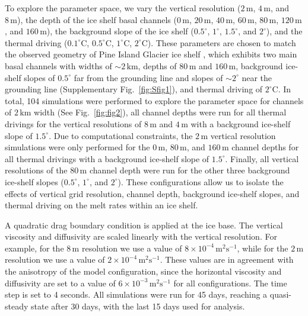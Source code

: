 \documentclass[draft]{agujournal2019}
\begin{document}
To explore the parameter space, we vary the vertical resolution ($2\,\mathrm{m}$, $4\,\mathrm{m}$, and $8\,\mathrm{m}$), the depth of the ice shelf basal channels ($0\,\mathrm{m}$, $20\,\mathrm{m}$, $40\,\mathrm{m}$, $60\,\mathrm{m}$, $80\,\mathrm{m}$, $120\,\mathrm{m}$, and $160\,\mathrm{m}$), the background slope of the ice shelf ($0.5^\circ$, $1^\circ$, $1.5^\circ$, and $2^\circ$), and the thermal driving ($0.1^\circ \mathrm{C}$, $0.5^\circ \mathrm{C}$, $1^\circ \mathrm{C}$, $2^\circ \mathrm{C}$). These parameters are chosen to match the observed geometry of Pine Island Glacier ice shelf \citep{Lowery_PIG_2025}, which exhibits two main basal channels with widths of $\sim2\,\mathrm{km}$, depths of $80\,\mathrm{m}$ and $160\,\mathrm{m}$, background ice-shelf slopes of $0.5^\circ$ far from the grounding line and slopes of $\sim2^\circ$ near the grounding line (Supplementary Fig.~\ref{fig:Sfig1}), and thermal driving of $2^\circ \mathrm{C}$. In total, 104 simulations were performed to explore the parameter space for channels of $2\,\mathrm{km}$ width (See Fig.~\ref{fig:fig2}), all channel depths were run for all thermal drivings for the vertical resolutions of $8\,\mathrm{m}$ and $4\,\mathrm{m}$ with a background ice-shelf slope of $1.5^\circ$. Due to computational constraints, the $2\,\mathrm{m}$ vertical resolution simulations were only performed for the $0\,\mathrm{m}$, $80\,\mathrm{m}$, and $160\,\mathrm{m}$ channel depths for all thermal drivings with a background ice-shelf slope of $1.5^\circ$. Finally, all vertical resolutions of the $80\,\mathrm{m}$ channel depth were run for the other three background ice-shelf slopes ($0.5^\circ$, $1^\circ$, and $2^\circ$). These configurations allow us to isolate the effects of vertical grid resolution, channel depth, background ice-shelf slopes, and thermal driving on the melt rates within an ice shelf. 

A quadratic drag boundary condition is applied at the ice base. The vertical viscosity and diffusivity are scaled linearly with the vertical resolution. For example, for the $8\,\mathrm{m}$ resolution we use a value of $8\times10^{-4}\,\mathrm{m^2 s^{-1}}$, while for the $2\,\mathrm{m}$ resolution we use a value of $2\times10^{-4}\,\mathrm{m^2 s^{-1}}$. These values are in agreement with the anisotropy of the model configuration, since the horizontal viscosity and diffusivity are set to a value of $6\times10^{-3}\,\mathrm{m^2 s^{-1}}$ for all configurations. The time step is set to 4 seconds. All simulations were run for 45 days, reaching a quasi-steady state after 30 days, with the last 15 days used for analysis.
\end{document}
